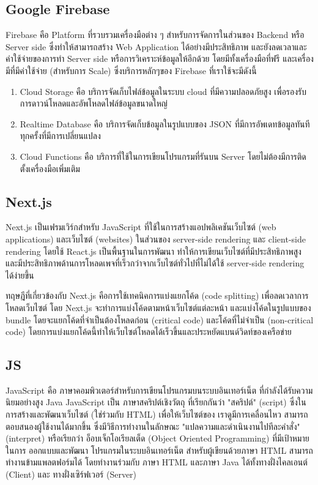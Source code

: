 \subsection{Google Firebase}
Firebase คือ Platform ที่รวบรวมเครื่องมือต่าง ๆ สำหรับการจัดการในส่วนของ Backend หรือ Server side
ซึ่งทำให้สามารถสร้าง Web Application ได้อย่างมีประสิทธิภาพ และยังลดเวลาและค่าใช้จ่ายของการทำ Server side
หรือการวิเคราะห์ข้อมูลให้อีกด้วย โดยมีทั้งเครื่องมือที่ฟรี และเครื่องมีที่มีค่าใช้จ่าย (สำหรับการ Scale) ซึ่งบริการหลักๆของ
Firebase ที่เราใช้จะมีดังนี้~\cite{fs-doc}

\begin{enumerate}
  \item Cloud Storage คือ บริการจัดเก็บไฟล์ข้อมูลในระบบ cloud ที่มีความปลอดภัยสูง เพื่อรองรับการดาวน์โหลดและอัพโหลดไฟล์ข้อมูลขนาดใหญ่
  \item Realtime Database คือ บริการจัดเก็บข้อมูลในรูปแบบของ JSON ที่มีการอัพเดทข้อมูลทันทีทุกครั้งที่มีการเปลี่ยนแปลง
  \item Cloud Functions คือ บริการที่ใช้ในการเขียนโปรแกรมที่รันบน Server โดยไม่ต้องมีการติดตั้งเครื่องมือเพิ่มเติม
\end{enumerate}

\subsection{Next.js}
Next.js เป็นเฟรมเวิร์กสำหรับ JavaScript ที่ใช้ในการสร้างแอปพลิเคชันเว็บไซต์ (web applications) และเว็บไซต์ (websites) ในส่วนของ
server-side rendering และ client-side rendering โดยใช้ React.js เป็นพื้นฐานในการพัฒนา ทำให้การเขียนเว็บไซต์ที่มีประสิทธิภาพสูง
และมีประสิทธิภาพด้านการโหลดเพจที่เร็วกว่าจากเว็บไซต์ทั่วไปที่ไม่ได้ใช้ server-side rendering ได้ง่ายขึ้น

ทฤษฎีที่เกี่ยวข้องกับ Next.js คือการใช้เทคนิคการแบ่งแยกโค้ด (code splitting) เพื่อลดเวลาการโหลดเว็บไซต์ โดย Next.js จะทำการแบ่งโค้ดตามหน้าเว็บไซต์แต่ละหน้า
และแบ่งโค้ดในรูปแบบของ bundle โดยจะแยกโค้ดที่จำเป็นต้องโหลดก่อน (critical code) และโค้ดที่ไม่จำเป็น (non-critical code)
โดยการแบ่งแยกโค้ดนี้ทำให้เว็บไซต์โหลดได้เร็วขึ้นและประหยัดแบนด์วิดท์ของเครือข่าย~\cite{react-doc}

\subsection{JS}
JavaScript คือ ภาษาคอมพิวเตอร์สำหรับการเขียนโปรแกรมบนระบบอินเทอร์เน็ต ที่กำลังได้รับความนิยมอย่างสูง Java JavaScript
เป็น ภาษาสคริปต์เชิงวัตถุ ที่เรียกกันว่า "สคริปต์" (script) ซึ่งในการสร้างและพัฒนาเว็บไซต์ (ใช่ร่วมกับ HTML) เพื่อให้เว็บไซต์ของ
เราดูมีการเคลื่อนไหว สามารถตอบสนองผู้ใช้งานได้มากขึ้น ซึ่งมีวิธีการทำงานในลักษณะ "แปลความและดำเนินงานไปทีละคำสั่ง"
(interpret) หรือเรียกว่า อ็อบเจ็กโอเรียลเต็ด (Object Oriented Programming) ที่มีเป้าหมายในการ ออกแบบและพัฒนา
โปรแกรมในระบบอินเทอร์เน็ต สำหรับผู้เขียนด้วยภาษา HTML สามารถทำงานข้ามแพลตฟอร์มได้ โดยทำงานร่วมกับ ภาษา HTML และภาษา
Java ได้ทั้งทางฝั่งไคลเอนต์ (Client) และ ทางฝั่งเซิร์ฟเวอร์ (Server)~\cite{js-doc}

